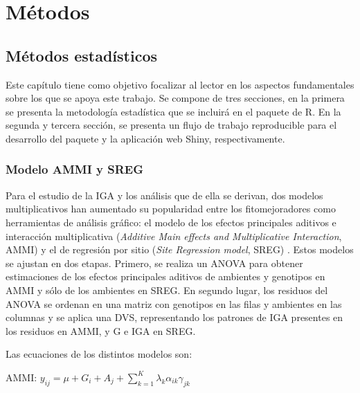 
\chapter{Métodos}
\section{Métodos estadísticos}

Este capítulo tiene como objetivo focalizar al lector en los aspectos fundamentales sobre los que se apoya este trabajo. Se compone de tres secciones, en la primera se presenta la metodología estadística que se incluirá en el paquete de R.  En la segunda y tercera sección, se presenta un flujo de trabajo reproducible para el desarrollo del paquete y la aplicación web Shiny, respectivamente.



\subsection{Modelo AMMI y SREG}
Para el estudio de la IGA y los análisis que de ella se derivan, dos modelos multiplicativos han aumentado su popularidad entre los fitomejoradores como herramientas de análisis gráfico: el modelo de los efectos principales aditivos e interacción multiplicativa (\emph{Additive Main effects and Multiplicative Interaction}, AMMI) \citep{Kempton1984,Gauch1988,Zobel1988} y el de regresión por sitio (\emph{Site Regression model}, SREG) \citep{Corneliusetal1996, GauchZobel1997, CrossaCorneliusYan2002}. Estos modelos se ajustan en dos etapas. Primero, se realiza un ANOVA para obtener estimaciones de los efectos principales aditivos de ambientes y genotipos en AMMI y sólo de los ambientes en SREG. En segundo lugar, los residuos del ANOVA se ordenan en una matriz con genotipos en las filas y ambientes en las columnas y se aplica una DVS, representando los patrones de IGA presentes en los residuos en AMMI, y G e IGA en SREG.

Las ecuaciones de los distintos modelos son:

\hspace{0.5cm} AMMI: $y_{ij}= \mu + G_i + A_j + \sum_{k=1}^K \lambda_k \alpha_{ik} \gamma_{jk}$

